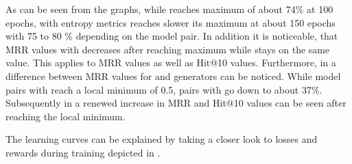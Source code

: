 As can be seen from the graphs, while \origsampling reaches maximum of about 74\% at 100 epochs, \ussoftmax with entropy metrics reaches slower its maximum at about 150 epochs with 75 to 80 \% depending on the model pair.
In addition it is noticeable, that MRR values with \origsampling decreases after reaching maximum while \ussoftmax stays on the same value.
This applies to MRR values as well as Hit@10 values.
Furthermore, in \origsampling a difference between MRR values for \distmult and \complex generators can be noticed.
While model pairs with \distmult reach a local minimum of 0.5, \model pairs with \complex go down to about 37\%.
Subsequently in \origisampling a renewed increase in MRR and Hit@10 values can be seen after reaching the local minimum.

The learning curves can be explained by taking a closer look to losses and rewards during training depicted in .
